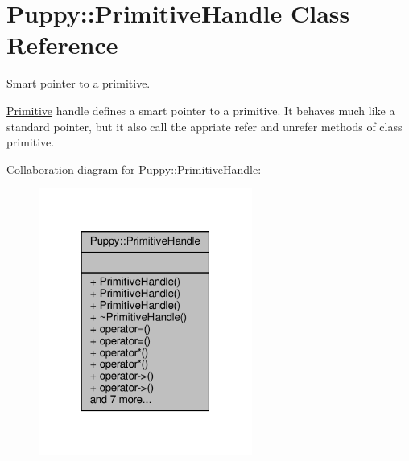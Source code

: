 \hypertarget{classPuppy_1_1PrimitiveHandle}{}\section{Puppy\+:\+:Primitive\+Handle Class Reference}
\label{classPuppy_1_1PrimitiveHandle}


Smart pointer to a primitive.

\hyperlink{classPuppy_1_1Primitive}{Primitive} handle defines a smart pointer to a primitive. It behaves much like a standard pointer, but it also call the appriate refer and unrefer methods of class primitive.  




Collaboration diagram for Puppy\+:\+:Primitive\+Handle\+:
\nopagebreak
\begin{figure}[H]
\begin{center}
\leavevmode
\includegraphics[width=199pt]{classPuppy_1_1PrimitiveHandle__coll__graph}
\end{center}
\end{figure}
